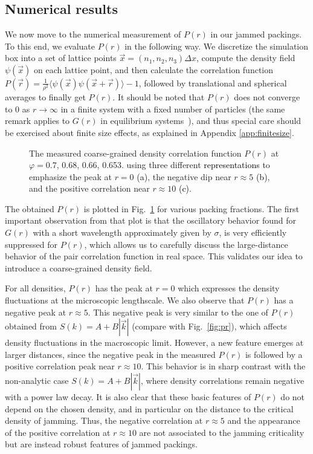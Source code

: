 \documentclass[aps,pre,twocolumn,superscriptaddress]{revtex4-1}
\newcommand{\red}[1]{\textcolor{black}{#1}}
\newcommand{\ave}[1]{\langle {#1} \rangle}
\begin{document}
\subsection{Numerical results}

We now move to the numerical measurement of $P(r)$ in our jammed 
packings. To this end, we evaluate $P(r)$ in the following way. 
We discretize the simulation box into a set of 
lattice points $\vec{x} = (n_1,n_2,n_3) \Delta x$, 
compute the density field $\psi(\vec{x})$ on each lattice point, 
and then calculate the correlation function 
$P(\vec{r}) = \frac{1}{\rho^2} \ave{\psi(\vec{x}) \psi(\vec{x}+\vec{r})} - 1$, 
followed by translational and spherical averages 
to finally get $P(r)$. It should be noted that 
$P(r)$ does not converge to 0 as $r \to \infty$
in a finite system with a fixed number of particles 
(the same remark applies to $G(r)$ in equilibrium 
systems~\cite{salacuse1996}), and 
thus special care should be exercised  about finite size effects,
as explained in Appendix \ref{app:finitesize}. 

\begin{figure}
\begin{center}
\caption{The measured coarse-grained density 
correlation function $P(r)$ at $\varphi = 0.7$, 0.68, 0.66, 0.653. 
using three different \red{representations} to emphasize
the peak at $r = 0$ \red{(a)}, the negative dip near $r \approx 5$ \red{(b)},
and the positive correlation near $r \approx 10$ \red{(c)}.}
\label{fig:prnum}
\end{center}
\end{figure}

The obtained $P(r)$ is plotted in Fig.~\ref{fig:prnum} for various 
packing fractions. The first important observation from that plot
is that the oscillatory behavior found for $G(r)$ 
with a short wavelength approximately given by $\sigma$,  
is very efficiently suppressed for $P(r)$, which allows us to carefully 
discuss the large-distance behavior of the pair correlation
function in real space. This validates our idea to 
introduce a coarse-grained density field. 

For all densities, $P(r)$ has the peak at $r=0$ which expresses 
the density fluctuations at the microscopic lengthscale. We also 
observe that $P(r)$ has a negative peak at $r \approx 5$. 
This negative peak is very similar to the one of $P(r)$ 
obtained from $S(k) = A + B|\vec{k}|$ (compare with Fig.~\ref{fig:pr}),
which affects density fluctuations in the macroscopic limit. 
However, a new feature emerges at larger distances, since the 
negative peak in the measured $P(r)$ is followed by a
positive correlation peak near $r \approx 10$. 
This behavior is in sharp contrast with the 
non-analytic case $S(k) = A + B|\vec{k}|$, 
where density correlations remain negative with a power law decay.
It is also clear that these basic features of $P(r)$ do not 
depend on the chosen density, and in particular on the distance 
to the critical density of jamming.
Thus, the negative correlation at $r \approx 5$ and 
the appearance of the positive correlation at $r \approx 10$ 
are not associated to the jamming criticality but are  instead
robust features of jammed packings. 
\end{document}
